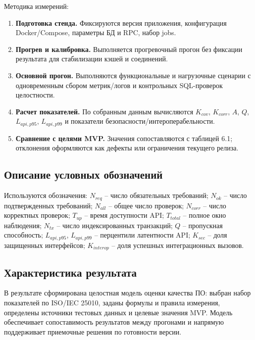 ﻿\documentclass[14pt,a4paper]{extarticle}
\begin{document}
\noindent Методика измерений:
\begin{enumerate}
  \item \textbf{Подготовка стенда.} Фиксируются версия приложения, конфигурация Docker/Compose, параметры БД и RPC, набор jobs.
  \item \textbf{Прогрев и калибровка.} Выполняется прогревочный прогон без фиксации результата для стабилизации кэшей и соединений.
  \item \textbf{Основной прогон.} Выполняются функциональные и нагрузочные сценарии с одновременным сбором метрик/логов и контрольных SQL-проверок целостности.
  \item \textbf{Расчет показателей.} По собранным данным вычисляются $K_{cov}$, $K_{corr}$, $A$, $Q$, $L_{api,p95}$, $L_{api,p99}$ и показатели безопасности/интероперабельности.
  \item \textbf{Сравнение с целями MVP.} Значения сопоставляются с таблицей 6.1; отклонения оформляются как дефекты или ограничения текущего релиза.
\end{enumerate}

\subsection{Описание условных обозначений}
\noindent Используются обозначения: $N_{req}$ -- число обязательных требований; $N_{ok}$ -- число подтвержденных требований; $N_{all}$ -- общее число проверок; $N_{corr}$ -- число корректных проверок; $T_{up}$ -- время доступности API; $T_{total}$ -- полное окно наблюдения; $N_{tx}$ -- число индексированных транзакций; $Q$ -- пропускная способность; $L_{api,p95}$, $L_{api,p99}$ -- перцентили латентности API; $K_{sec}$ -- доля защищенных интерфейсов; $K_{interop}$ -- доля успешных интеграционных вызовов.

\subsection{Характеристика результата}
\noindent В результате сформирована целостная модель оценки качества ПО: выбран набор показателей по ISO/IEC 25010, заданы формулы и правила измерения, определены источники тестовых данных и целевые значения MVP. Модель обеспечивает сопоставимость результатов между прогонами и напрямую поддерживает приемочные решения по готовности версии.
\end{document}
